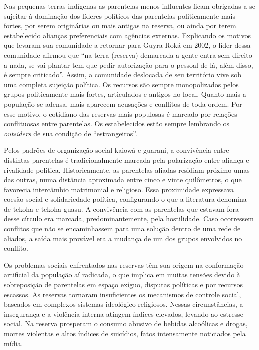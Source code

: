 {{Nas pequenas terras indígenas as parentelas menos influentes ficam
obrigadas a se sujeitar à dominação dos líderes políticos das
parentelas politicamente mais fortes, por serem originárias ou mais
antigas na reserva, ou ainda por terem estabelecido alianças
preferenciais com agências externas. Explicando os motivos que levaram
sua comunidade a retornar para Guyra Roká em 2002, o líder dessa
comunidade afirmou que ``na terra (reserva) demarcada a gente entra sem
direito a nada, se vai plantar tem que pedir autorização para o pessoal
de lá, além disso, é sempre criticado''. Assim, a comunidade deslocada
de seu território vive sob uma completa sujeição política. Os recursos
são sempre monopolizados pelos grupos politicamente mais fortes,
articulados e antigos no local. Quanto mais a população se adensa, mais
aparecem acusações e conflitos de toda ordem. Por esse motivo, o
cotidiano das reservas mais populosas é marcado por relações
conflituosas entre parentelas. Os estabelecidos estão sempre lembrando
os \emph{outsiders} de sua condição de ``estrangeiros''. 

Pelos padrões de organização social kaiowá e guarani, a convivência
entre distintas parentelas é tradicionalmente marcada pela polarização
entre aliança e rivalidade política. Historicamente, as parentelas
aliadas residiam próximo umas das outras, numa distância aproximada
entre cinco e vinte quilômetros, o que favorecia intercâmbio
matrimonial e religioso. Essa proximidade expressava coesão social e
solidariedade política, configurando o que a literatura denomina de
tekoha e tekoha guasu. A convivência com as parentelas que estavam fora
desse círculo era marcada, predominantemente, pela hostilidade. Caso
ocorressem conflitos que não se encaminhassem para uma solução dentro
de uma rede de aliados, a saída mais provável era a mudança de um dos
grupos envolvidos no conflito.

Os problemas sociais enfrentados nas reservas têm sua origem na
conformação artificial da população aí radicada, o que implica em
muitas tensões devido à sobreposição de parentelas em espaço exíguo,
disputas políticas e por recursos escassos. As reservas tornaram
insuficientes os mecanismos de controle social, baseados em complexos
sistemas ideológico-religiosos. Nessas circunstâncias, a insegurança e
a violência interna atingem índices elevados, levando ao estresse
social. Na reserva prosperam o consumo abusivo de bebidas alcoólicas e
drogas, mortes violentas e altos índices de suicídios, fatos
intensamente noticiados pela mídia.

}}
